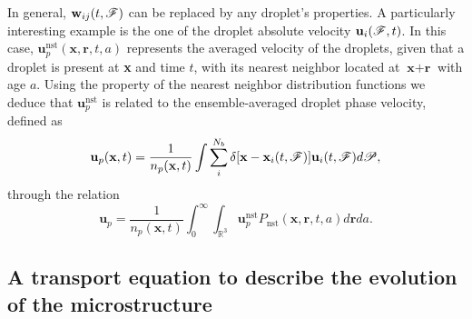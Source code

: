 In general, $\textbf{w}_{ij}(t,\mathscr{F})$ can be replaced by any droplet's properties. 
A particularly interesting example is the one of the droplet absolute velocity $\textbf{u}_i(\mathscr{F},t)$.
In this case, $\textbf{u}^\text{nst}_p(\textbf{x},\textbf{r},t,a)$ represents the averaged velocity of the droplets, given that a droplet is present at \textbf{x} and time $t$, with its nearest neighbor located at $\textbf{x}+\textbf{r}$ with age $a$. 
Using the property of the nearest neighbor distribution functions we deduce that  $\textbf{u}^\text{nst}_p$ is related to the ensemble-averaged droplet phase velocity, defined as 
\begin{equation*}
    \textbf{u}_p(\textbf{x},t)=\frac{1}{n_p(\textbf{x},t)} 
    \int \sum_{i}^{N_b}\delta[\textbf{x}-\textbf{x}_i(t,\mathscr{F})]  \textbf{u}_i(t,\mathscr{F})d\mathscr{P},
\end{equation*}
through the relation
\begin{equation}
    \textbf{u}_p = \frac{1}{n_p(\textbf{x},t)} \int_0^\infty \int_{\mathbb{R}^3} \textbf{u}_p^\text{nst} P_\text{nst}(\textbf{x},\textbf{r},t,a) d\textbf{r} da. 
    \label{eq:u_p}
\end{equation}




\subsection{A transport equation to describe the evolution of the microstructure}

